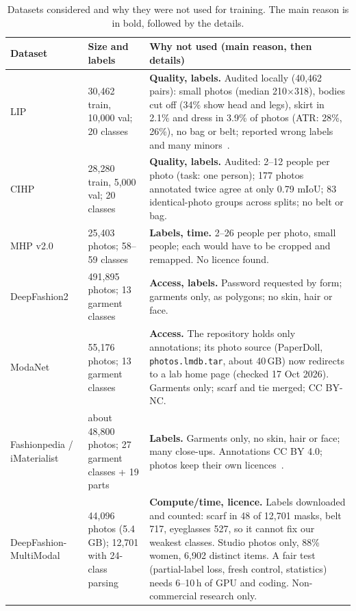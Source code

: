 \documentclass[conference,a4paper]{IEEEtran}
\begin{document}
\begin{table}[t]\centering\footnotesize
\caption{Datasets considered and why they were not used for training. The main reason is in bold, followed by the details.}\label{tab:datasets}
\begin{tabularx}{\textwidth}{@{}P{2.7cm}P{3.0cm}L@{}}
\toprule
\textbf{Dataset} & \textbf{Size and labels} & \textbf{Why not used (main reason, then details)}\\
\midrule
LIP~\cite{lip} & 30,462 train, 10,000 val; 20 classes & \textbf{Quality, labels.} Audited locally (40,462 pairs): small photos (median 210$\times$318), bodies cut off (34\% show head and legs), skirt in 2.1\% and dress in 3.9\% of photos (ATR: 28\%, 26\%), no bag or belt; reported wrong labels and many minors~\cite{fashnblog}.\\
CIHP~\cite{cihp} & 28,280 train, 5,000 val; 20 classes & \textbf{Quality, labels.} Audited: 2--12 people per photo (task: one person); 177 photos annotated twice agree at only 0.79 mIoU; 83 identical-photo groups across splits; no belt or bag.\\
MHP v2.0~\cite{mhp} & 25,403 photos; 58--59 classes & \textbf{Labels, time.} 2--26 people per photo, small people; each would have to be cropped and remapped. No licence found.\\
DeepFashion2~\cite{deepfashion2} & 491,895 photos; 13 garment classes & \textbf{Access, labels.} Password requested by form; garments only, as polygons; no skin, hair or face.\\
ModaNet~\cite{modanet} & 55,176 photos; 13 garment classes & \textbf{Access.} The repository holds only annotations; its photo source (PaperDoll, \texttt{photos.lmdb.tar}, about 40\,GB) now redirects to a lab home page (checked 17 Oct 2026). Garments only; scarf and tie merged; CC BY-NC.\\
Fashionpedia / iMaterialist~\cite{fashionpedia} & about 48,800 photos; 27 garment classes + 19 parts & \textbf{Labels.} Garments only, no skin, hair or face; many close-ups. Annotations CC BY 4.0; photos keep their own licences~\cite{fashionpedialicence}.\\
DeepFashion-MultiModal~\cite{dfmm} & 44,096 photos (5.4\,GB); 12,701 with 24-class parsing & \textbf{Compute/time, licence.} Labels downloaded and counted: scarf in 48 of 12,701 masks, belt 717, eyeglasses 527, so it cannot fix our weakest classes. Studio photos only, 88\% women, 6,902 distinct items. A fair test (partial-label loss, fresh control, statistics) needs 6--10\,h of GPU and coding. Non-commercial research only.\\

\end{tabularx}
\end{table}
\end{document}
